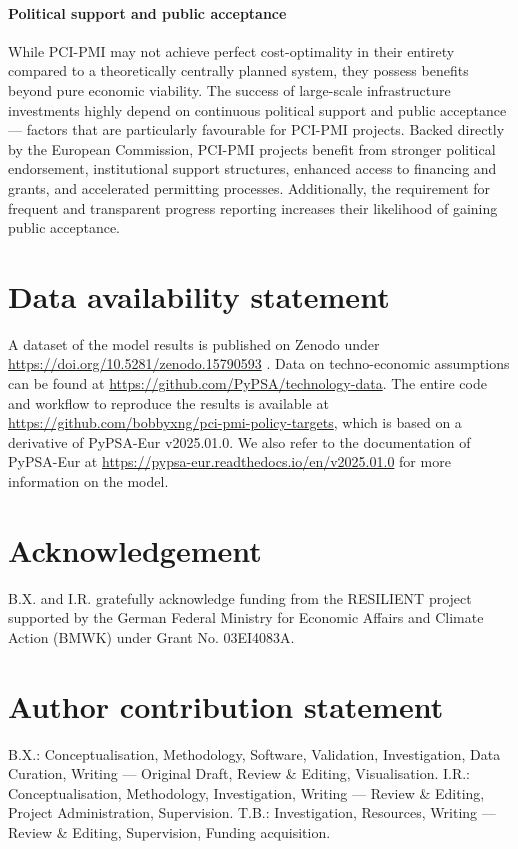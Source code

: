 \documentclass[pdflatex,sn-nature]{sn-jnl}
\theoremstyle{thmstyleone}%
\theoremstyle{thmstyletwo}%
\theoremstyle{thmstylethree}%
\begin{document}
\paragraph{Political support and public acceptance} 
While PCI-PMI may not achieve perfect cost-optimality in their entirety compared to a theoretically centrally planned system, they possess benefits beyond pure economic viability. The success of large-scale infrastructure investments highly depend on continuous political support and public acceptance --- factors that are particularly favourable for PCI-PMI projects.
Backed directly by the European Commission, PCI-PMI projects benefit from stronger political endorsement, institutional support structures, enhanced access to financing and grants, and accelerated permitting processes. Additionally, the requirement for frequent and transparent progress reporting increases their likelihood of gaining public acceptance.

\backmatter

\clearpage
\section*{Data availability statement}
A dataset of the model results is published on Zenodo under \href{https://doi.org/10.5281/zenodo.15790593}{https://doi.org/10.5281/zenodo.15790593} \cite{xiongResultDataRole2025}. Data on techno-economic assumptions can be found at \href{https://github.com/PyPSA/technology-data}{https://github.com/PyPSA/technology-data}. The entire code and workflow to reproduce the results is available at \href{https://github.com/bobbyxng/pci-pmi-policy-targets}{https://github.com/bobbyxng/pci-pmi-policy-targets}, which is based on a derivative of PyPSA-Eur v2025.01.0. We also refer to the documentation of PyPSA-Eur at \href{https://pypsa-eur.readthedocs.io/en/v2025.01.0}{https://pypsa-eur.readthedocs.io/en/v2025.01.0} for more information on the model.

\section*{Acknowledgement}
B.X. and I.R. gratefully acknowledge funding from the RESILIENT project supported by the German Federal Ministry for Economic Affairs and Climate Action (BMWK) under Grant No. 03EI4083A. 

\section*{Author contribution statement}
B.X.: Conceptualisation, Methodology, Software, Validation, Investigation, Data Curation, Writing --- Original Draft, Review \& Editing, Visualisation. I.R.: Conceptualisation, Methodology, Investigation, Writing --- Review \& Editing, Project Administration, Supervision. T.B.: Investigation, Resources, Writing --- Review \& Editing, Supervision, Funding acquisition.
\end{document}
